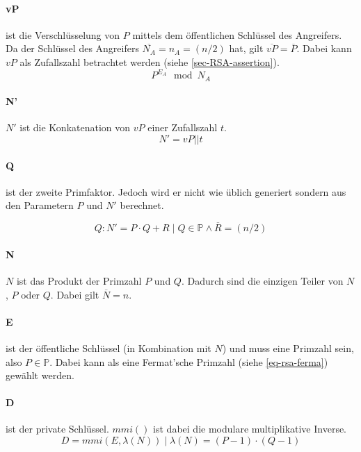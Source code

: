             \paragraph{vP} ist die Verschlüsselung von $P$ mittels dem öffentlichen Schlüssel des Angreifers. Da der Schlüssel des Angreifers $\overline{N_{A}} = n_{A} = (n/2)$ hat, gilt $\overline{vP} = \overline{P}$. Dabei kann $vP$ als Zufallszahl betrachtet werden (siehe \ref{sec-RSA-assertion}). 
                \begin{equation}
                    P^{E_{A}} \mod N_{A}
                \end{equation}                
            
            \paragraph{N'} $N'$ ist die Konkatenation von $vP$ einer Zufallszahl $t$.
            \begin{equation}
                N' = vP || t
            \end{equation}

            \paragraph{Q} ist der zweite Primfaktor. Jedoch wird er nicht wie üblich generiert sondern aus den Parametern $P$ und $N'$ berechnet.
            
            \begin{equation}
                Q : N' = P \cdot Q + R \mid Q \in \mathbb{P} \wedge \overline{R} = (n/2)
            \end{equation}

            \paragraph{N} $N$ ist das Produkt der Primzahl $P$ und $Q$. Dadurch sind die einzigen Teiler von $N$, $P$ oder $Q$. Dabei gilt $\overline{N} = n$.

            \paragraph{E} ist der öffentliche Schlüssel (in Kombination mit $N$) und muss eine Primzahl sein, also $P \in \mathbb{P}$. Dabei kann als eine Fermat'sche Primzahl (siehe \ref{eq-rsa-ferma}) gewählt werden.

            \paragraph{D} ist der private Schlüssel. $mmi()$ ist dabei die modulare multiplikative Inverse.
            \begin{equation}
                D = mmi(E, \lambda(N)) \mid \lambda(N) = (P-1)\cdot(Q-1)
            \end{equation}

